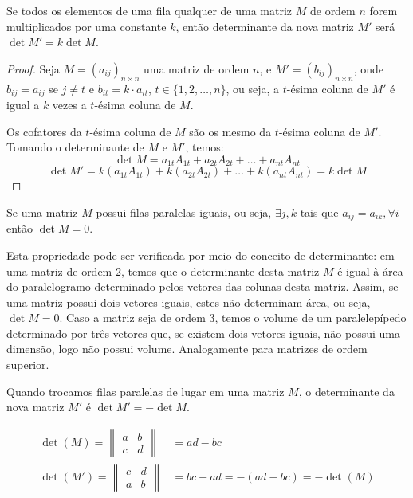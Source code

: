 \begin{prop}
Se todos os elementos de uma fila qualquer de uma matriz $M$ de ordem $n$ forem multiplicados por uma constante $k$, então determinante da nova matriz $M'$ será $\det M' = k \det M$.
\begin{proof}
Seja $M=(a_{ij})_{n\times n}$ uma matriz de ordem $n$, e $M'=(b_{ij})_{n\times n}$, onde $b_{ij}=a_{ij}$ se $j \neq t$ e $b_{it}=k\cdot a_{it}$, $t \in \{1,2,\dots,n\}$, ou seja, a $t$-ésima coluna de $M'$ é igual a $k$ vezes a $t$-ésima coluna de $M$. \par 
Os cofatores da $t$-ésima coluna de $M$ são os mesmo da $t$-ésima coluna de $M'$. Tomando o determinante de $M$ e $M'$, temos: \[\det M = a_{1t}A_{1t}+a_{2t}A_{2t}+\dots+a_{nt}A_{nt}\] \[\det M'= k(a_{1t}A_{1t}) + k(a_{2t}A_{2t}) + \dots + k(a_{nt}A_{nt})=k \det M\]
\end{proof}
\end{prop}

\begin{prop}
Se uma matriz $M$ possui filas paralelas iguais, ou seja, $\exists j,k$ tais que $a_{ij}=a_{ik}, \forall i$ então $\det M =0$. \par 
Esta propriedade pode ser verificada por meio do conceito de determinante: em uma matriz de ordem 2, temos que o determinante desta matriz $M$ é igual à área do paralelogramo determinado pelos vetores das colunas desta matriz. Assim, se uma matriz possui dois vetores iguais, estes não determinam área, ou seja, $\det M =0$. Caso a matriz seja de ordem 3, temos o volume de um paralelepípedo determinado por três vetores que, se existem dois vetores iguais, não possui uma dimensão, logo não possui volume. Analogamente para matrizes de ordem superior.
\end{prop}

\begin{prop}
Quando trocamos filas paralelas de lugar em uma matriz $M$, o determinante da nova matriz $M'$ é $\det M'=-\det M$.
\begin{exemplo}
\begin{align*}
\det(M)=\begin{Vmatrix}
a & b\\
c & d
\end{Vmatrix}&=ad-bc \\
\det(M')=\begin{Vmatrix}
c & d \\
a & b
\end{Vmatrix}&=bc-ad=-(ad-bc)=-\det(M)
\end{align*}
\end{exemplo}
\end{prop}

